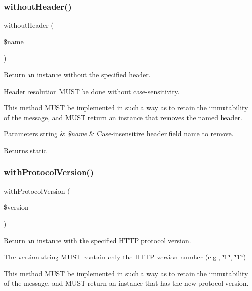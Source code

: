 \subsubsection{\texorpdfstring{without\+Header()}{withoutHeader()}}
{\footnotesize\ttfamily without\+Header (\begin{DoxyParamCaption}\item[{}]{\$name }\end{DoxyParamCaption})}

Return an instance without the specified header.

Header resolution M\+U\+ST be done without case-\/sensitivity.

This method M\+U\+ST be implemented in such a way as to retain the immutability of the message, and M\+U\+ST return an instance that removes the named header.


\begin{DoxyParams}[1]{Parameters}
string & {\em \$name} & Case-\/insensitive header field name to remove. \\
\hline
\end{DoxyParams}
\begin{DoxyReturn}{Returns}
static 
\end{DoxyReturn}
\mbox{\label{class_pes_1_1_http_1_1_message_a96527577349f271afb58287162b40e67}} 
\subsubsection{\texorpdfstring{with\+Protocol\+Version()}{withProtocolVersion()}}
{\footnotesize\ttfamily with\+Protocol\+Version (\begin{DoxyParamCaption}\item[{}]{\$version }\end{DoxyParamCaption})}

Return an instance with the specified H\+T\+TP protocol version.

The version string M\+U\+ST contain only the H\+T\+TP version number (e.\+g., \char`\"{}1.\char`\"{}, \char`\"{}1.\char`\"{}).

This method M\+U\+ST be implemented in such a way as to retain the immutability of the message, and M\+U\+ST return an instance that has the new protocol version.


